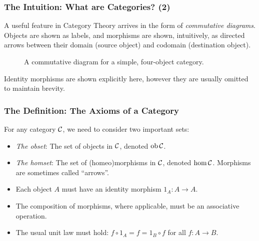 \documentclass{beamer}
\numberwithin{figure}{section}
\begin{document}
\begin{frame}
        \frametitle{The Intuition: What are Categories? (2)}
        A useful feature in Category Theory arrives in the form of
        \emph{commutative diagrams}. Objects are shown as labels, and morphisms
        are shown, intuitively, as directed arrows between their domain (source
        object) and codomain (destination object).
        \pause
        \begin{figure}
                \caption{A commutative diagram for a simple, four-object
                        category.}
        \end{figure}
        Identity morphisms are shown explicitly here, however they are usually
        omitted to maintain brevity.
\end{frame}

\begin{frame}
        \frametitle{The Definition: The Axioms of a Category}
        For any category $\mathcal{C}$, we need to consider two important sets:
        \begin{itemize}
                \item \emph{The obset}: The set of objects in $\mathcal{C}$,
                        denoted $\operatorname{ob}{\mathcal{C}}$.
                \item \emph{The homset}: The set of (homeo)morphisms in
                        $\mathcal{C}$, denoted $\hom{\ensuremath\mathcal{C}}$. Morphisms
                        are sometimes called ``arrows''.
        \end{itemize}
        \begin{itemize}
                \item Each object $A$ must have an identity morphism $1_A \colon
                        A \to A$.
                \item The composition of morphisms, where applicable, must be an
                        associative operation.
                \item The usual unit law must hold: $f \circ 1_A = f = 1_B \circ
                        f$ for all $f \colon A \to B$.
        \end{itemize}
\end{frame}
\end{document}
